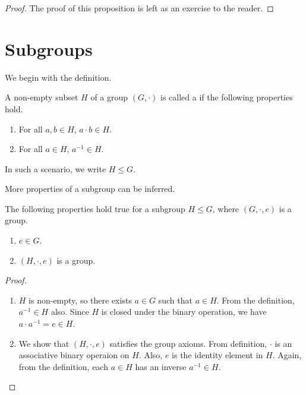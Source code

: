 \begin{proof}
    The proof of this proposition is left as an exercise to the reader.
\end{proof}


\section{Subgroups}

We begin with the definition.

\begin{definition}
    A non-empty subset $H$ of a group $(G,\cdot)$ is called a  if the following properties hold.
    \begin{enumerate}
        \item For all $a,b \in H$, $a \cdot b \in H$.
        \item For all $a \in H$, $a^{-1} \in H$.
    \end{enumerate}
    In such a scenario, we write $H \leqslant G$.
\end{definition}

More properties of a subgroup can be inferred.

\begin{proposition}
    The following properties hold true for a subgroup $H \leqslant G$, where $(G,\cdot,e)$ is a group.
    \begin{enumerate}
        \item $e \in G$.
        \item $(H,\cdot,e)$ is a group.
    \end{enumerate}
\end{proposition}

\begin{proof}
    \begin{enumerate}
        \item $H$ is non-empty, so there exists $a \in G$ such that $a \in H$. From the definition, $a^{-1} \in H$ also. Since $H$ is closed under the binary operation, we have $a \cdot a^{-1} = e \in H$.
        
        \item We show that $(H,\cdot,e)$ satisfies the group axioms. From definition, $\cdot$ is an associative binary operaion on $H$. Also, $e$ is the identity element in $H$. Again, from the definition, each $a \in H$ has an inverse $a^{-1} \in H$.
    \end{enumerate}
\end{proof}

